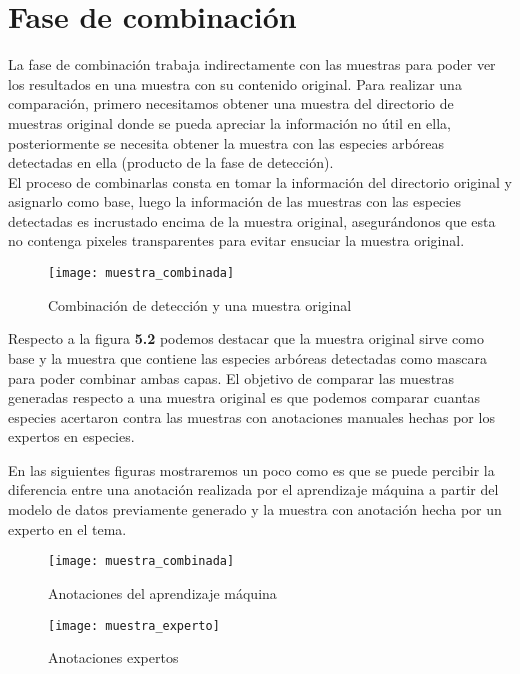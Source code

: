 \section{Fase de combinación}
La fase de combinación trabaja indirectamente con las muestras para poder ver los resultados en una muestra con su contenido original. Para realizar una comparación, primero necesitamos obtener una muestra del directorio de muestras original donde se pueda apreciar la información no útil en ella, posteriormente se necesita obtener la muestra con las especies arbóreas detectadas en ella (producto de la fase de detección).\\ 

El proceso de combinarlas consta en tomar la información del directorio original y asignarlo como base, luego la información de las muestras con las especies detectadas es incrustado encima de la muestra original, asegurándonos que esta no contenga pixeles transparentes para evitar ensuciar la muestra original.

\begin{figure}[H]
  \centering
  \begin{minipage}[b]{0.8\textwidth}
        \texttt{[image: muestra\_combinada]}
    \caption{Combinación de detección y una muestra original}
  \end{minipage}
\end{figure}

Respecto a la figura \textbf{5.2} podemos destacar que la muestra original sirve como base y la muestra que contiene las especies arbóreas detectadas como mascara para poder combinar ambas capas. El objetivo de comparar las muestras generadas respecto a una muestra original es que podemos comparar cuantas especies acertaron contra las muestras con anotaciones manuales hechas por los expertos en especies.

\break


En las siguientes figuras mostraremos un poco como es que se puede percibir la diferencia entre una anotación realizada por el aprendizaje máquina a partir del modelo de datos previamente generado y la muestra con anotación hecha por un experto en el tema. \\

\begin{figure}[H]
  \centering
  \begin{minipage}[b]{0.4\textwidth}
    \texttt{[image: muestra\_combinada]}
    \caption{Anotaciones del aprendizaje máquina}
  \end{minipage}
  \hfill
  \begin{minipage}[b]{0.4\textwidth}
    \texttt{[image: muestra\_experto]}
    \caption{Anotaciones expertos}
  \end{minipage}
\end{figure}

